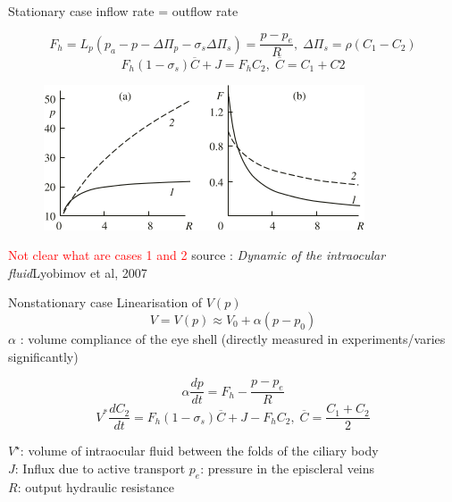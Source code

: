 \begin{frame}{Stationary case}
 inflow rate = outflow rate
\begin{block}{}
\[
F_h = L_p \left(p_a-p-\Delta \Pi_p - \sigma_s \Delta\Pi_s\right) = \frac{p - p_e}{R}, \; \Delta \Pi_s = \rho(C_1-C_2)
\]
\[
F_h (1 - \sigma_s) \overline{C} + J = F_hC_2 , \; \overline{C}= C_1+C2
\]

\end{block}
\begin{figure}[H]
\includegraphics[scale=1]{images/courbes_pr_fr}
\end{figure}
\textcolor{red}{Not clear what are cases 1 and 2}
\tiny{source : \textit{Dynamic of the intraocular fluid}Lyobimov et al, 2007}
\end{frame}

\begin{frame}{Nonstationary case}
Linearisation of $V(p)$
\[
V = V(p) \approx V_0 + \alpha (p-p_0)
\]
$\alpha$ : volume compliance of the eye shell (directly measured in experiments/varies significantly)

\begin{block}{}
\[
 \alpha \frac{dp}{dt}=F_{h}-\frac{p-p_e}{R}
 \]
\[
 V^{\ast} \frac{dC_{2}}{dt}= F_h(1-\sigma_s)\overline{C} + J - F_hC_2,\; \overline{C}= \frac{C_1+C_2}{2}
 \]
\end{block}

$V^\star$: volume of intraocular fluid between the folds of the ciliary body\\
$J$: Influx due to active transport
$p_e$: pressure in the episcleral veins\\
$R$: output hydraulic resistance\\

\end{frame}

